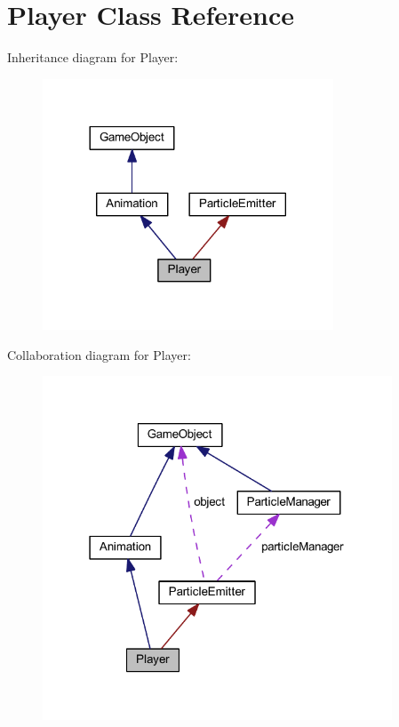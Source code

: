 \hypertarget{class_player}{\section{Player Class Reference}
\label{class_player}
}


Inheritance diagram for Player\+:\nopagebreak
\begin{figure}[H]
\begin{center}
\leavevmode
\includegraphics[width=245pt]{class_player__inherit__graph}
\end{center}
\end{figure}


Collaboration diagram for Player\+:\nopagebreak
\begin{figure}[H]
\begin{center}
\leavevmode
\includegraphics[width=295pt]{class_player__coll__graph}
\end{center}
\end{figure}
